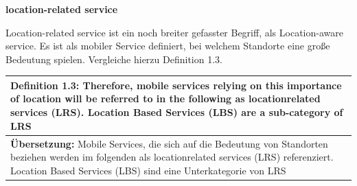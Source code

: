 \newpage
\textbf{location-related service} 

Location-related service ist ein noch breiter gefasster Begriff, als Location-aware service. Es ist als mobiler Service definiert, bei welchem Standorte eine große Bedeutung spielen. Vergleiche hierzu Definition 1.3.

\begin{table}[h]
	\centering
	\begin{tabular}{|p{16cm}|}\hline
		\textbf{Definition 1.3:} \glqq Therefore, mobile services relying on this importance of location will be referred to in the following as locationrelated services (LRS). Location Based Services (LBS) are a sub-category of LRS \grqq \cite[S.5]{strueker2003}\\ \hline
		\textbf{Übersetzung:} Mobile Services, die sich auf die Bedeutung von Standorten beziehen werden im folgenden als locationrelated services (LRS) referenziert. Location Based Services (LBS) sind eine Unterkategorie von LRS  \\ \hline
	\end{tabular}
\end{table}





